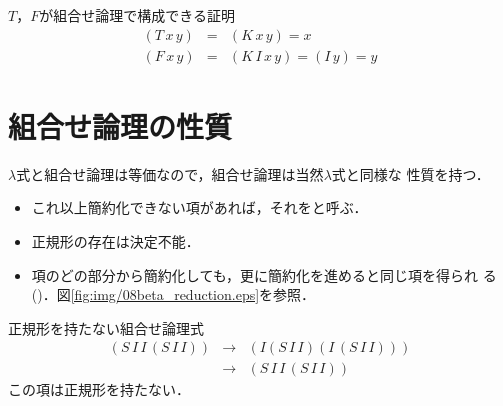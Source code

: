 \begin{myproof}{$T$，$F$が組合せ論理で構成できる証明}
\begin{eqnarray*}
 (T \, x \, y) &=& (K \, x \, y) = x \\
 (F \, x \, y) &=& (K \, I \, x \, y) = (I \, y) = y
\end{eqnarray*}
\end{myproof}

\section{組合せ論理の性質}
$\lambda$式と組合せ論理は等価なので，組合せ論理は当然$\lambda$式と同様な
性質を持つ．

\begin{itemize}
 \item これ以上簡約化できない項があれば，それをと呼ぶ．
 \item 正規形の存在は決定不能．
 \item 項のどの部分から簡約化しても，更に簡約化を進めると同じ項を得られ
       る()．図\ref{fig:img/08beta_reduction.eps}を参照．
\end{itemize}

\begin{myexample}{正規形を持たない組合せ論理式}
\begin{eqnarray*}
 (S \, I \, I \, (S \, I \, I)) &\rightarrow& (I (S \, I \, I) (I \, (S \,
  I \, I))) \\
 &\rightarrow& (S \, I \, I \, (S \, I \, I))
\end{eqnarray*}
 この項は正規形を持たない．
\end{myexample}


